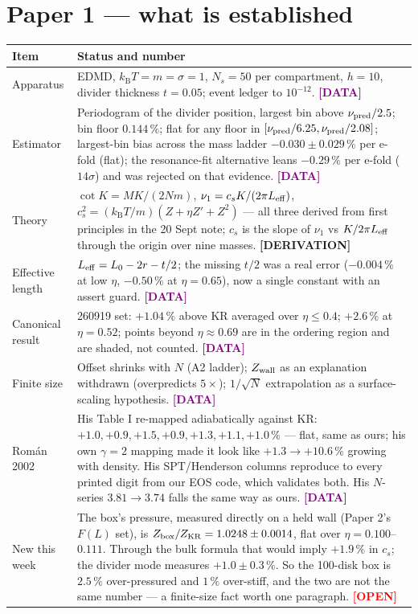 \documentclass[11pt,a4paper]{article}
\newcommand{\kT}{k_{\mathrm B}T}
\newcommand{\dat}{\textcolor{Purple}{\textbf{[DATA]}}}
\newcommand{\der}{\textcolor{NavyBlue}{\textbf{[DERIVATION]}}}
\newcommand{\opn}{\textcolor{Red}{\textbf{[OPEN]}}}
\begin{document}
\section{Paper 1 --- what is established}
\begin{center}\small
\begin{tabular}{@{}p{5.2cm}p{9.6cm}@{}}
\toprule
Item & Status and number \\
\midrule
Apparatus & EDMD, $\kT = m = \sigma = 1$, $N_s = 50$ per compartment, $h = 10$, divider thickness $t = 0.05$; event ledger to $10^{-12}$. \dat{} \\
Estimator & Periodogram of the divider position, largest bin above $\nu_{\rm pred}/2.5$; bin floor $0.144\,\%$; flat for any floor in $[\nu_{\rm pred}/6.25, \nu_{\rm pred}/2.08]$; largest-bin bias across the mass ladder $-0.030 \pm 0.029\,\%$ per e-fold (flat); the resonance-fit alternative leans $-0.29\,\%$ per e-fold ($14\sigma$) and was rejected on that evidence. \dat{} \\
Theory & $\cot K = MK/(2Nm)$, $\nu_1 = c_s K/(2\pi L_{\rm eff})$, $c_s^2 = (\kT/m)(Z + \eta Z' + Z^2)$ --- all three derived from first principles in the 20 Sept note; $c_s$ is the slope of $\nu_1$ vs $K/2\pi L_{\rm eff}$ through the origin over nine masses. \der{} \\
Effective length & $L_{\rm eff} = L_0 - 2r - t/2$; the missing $t/2$ was a real error ($-0.004\,\%$ at low $\eta$, $-0.50\,\%$ at $\eta = 0.65$), now a single constant with an assert guard. \dat{} \\
Canonical result & 260919 set: $+1.04\,\%$ above KR averaged over $\eta \le 0.4$; $+2.6\,\%$ at $\eta = 0.52$; points beyond $\eta \approx 0.69$ are in the ordering region and are shaded, not counted. \dat{} \\
Finite size & Offset shrinks with $N$ (A2 ladder); $Z_{\rm wall}$ as an explanation withdrawn (overpredicts $5\times$); $1/\sqrt N$ extrapolation as a surface-scaling hypothesis. \dat{} \\
Rom\'an 2002 & His Table I re-mapped adiabatically against KR: $+1.0, +0.9, +1.5, +0.9, +1.3, +1.1, +1.0\,\%$ --- flat, same as ours; his own $\gamma = 2$ mapping made it look like $+1.3 \to +10.6\,\%$ growing with density. His SPT/Henderson columns reproduce to every printed digit from our EOS code, which validates both. His $N$-series $3.81 \to 3.74$ falls the same way as ours. \dat{} \\
New this week & The box's pressure, measured directly on a held wall (Paper 2's $F(L)$ set), is $Z_{\rm box}/Z_{\rm KR} = 1.0248 \pm 0.0014$, flat over $\eta = 0.100$--$0.111$. Through the bulk formula that would imply $+1.9\,\%$ in $c_s$; the divider mode measures $+1.0 \pm 0.3\,\%$. So the 100-disk box is $2.5\,\%$ over-pressured and $1\,\%$ over-stiff, and the two are not the same number --- a finite-size fact worth one paragraph. \opn{} \\

\end{tabular}
\end{center}
\end{document}
